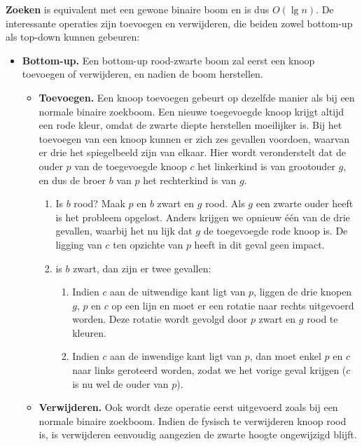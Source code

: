 \documentclass{report}
\begin{document}
	\textbf{Zoeken} is equivalent met een gewone binaire boom en is dus $O(\lg n)$. De interessante operaties zijn toevoegen en verwijderen, die beiden zowel bottom-up als top-down kunnen gebeuren:
	\begin{itemize}
		\item \textbf{Bottom-up.}
			Een bottom-up rood-zwarte boom zal eerst een knoop toevoegen of verwijderen, en nadien de boom herstellen.
			\begin{itemize}
				\item \textbf{Toevoegen.}
				Een knoop toevoegen gebeurt op dezelfde manier als bij een normale binaire zoekboom. Een nieuwe toegevoegde knoop krijgt altijd een rode kleur, omdat de zwarte diepte herstellen moeilijker is. Bij het toevoegen van een knoop kunnen er zich zes gevallen voordoen, waarvan er drie het spiegelbeeld zijn van elkaar. Hier wordt veronderstelt dat de ouder $p$ van de toegevoegde knoop $c$ het linkerkind is van grootouder $g$, en dus de broer $b$ van $p$ het rechterkind is van $g$. 
				\begin{enumerate}
					\item Is $b$ rood? Maak $p$ en $b$ zwart en $g$ rood. Als $g$ een zwarte ouder heeft is het probleem opgelost. Anders krijgen we opnieuw één van de drie gevallen, waarbij het nu lijk dat $g$ de toegevoegde rode knoop is. De ligging van $c$ ten opzichte van $p$ heeft in dit geval geen impact. 
					\item is $b$ zwart, dan zijn er twee gevallen:
					\begin{enumerate}
						\item Indien $c$ aan de uitwendige kant ligt van $p$, liggen de drie knopen $g$, $p$ en $c$ op een lijn en moet er een rotatie naar rechts uitgevoerd worden. Deze rotatie wordt gevolgd door $p$ zwart en $g$ rood te kleuren.
						\item Indien $c$ aan de inwendige kant ligt van $p$, dan moet enkel $p$ en $c$ naar links geroteerd worden, zodat we het vorige geval krijgen ($c$ is nu wel de ouder van $p$).
					\end{enumerate}
				\end{enumerate}
				\item \textbf{Verwijderen.} Ook wordt deze operatie eerst uitgevoerd zoals bij een normale binaire zoekboom. Indien de fysisch te verwijderen knoop rood is, is verwijderen eenvoudig aangezien de zwarte hoogte ongewijzigd blijft. 
			\end{itemize}
		

\end{itemize}
\end{document}
